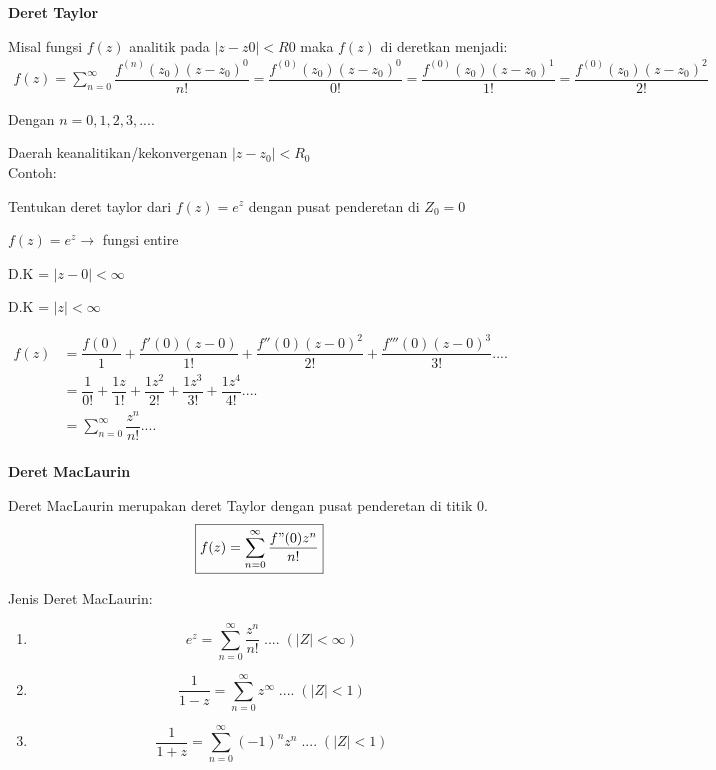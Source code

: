 \documentclass{article}
\begin{document}
\textbf{Deret Taylor}

Misal fungsi $f(z)$ analitik pada $|z-z0| < R0$ maka $f(z)$ di deretkan menjadi:
\begin{align}
    \boxed{f(z) = \sum_{n=0}^{\infty}\dfrac{f^{(n)}{(z_0)(z-z_0)^0}}{n!}=\dfrac{f^{(0)}{(z_0)(z-z_0)^0}}{0!}=\dfrac{f^{(0)}{(z_0)(z-z_0)^1}}{1!}=\dfrac{f^{(0)}{(z_0)(z-z_0)^2}}{2!}}
    \nonumber
\end{align}

Dengan $n = 0, 1, 2, 3, ....$

Daerah keanalitikan/kekonvergenan $|z-z_0| < R_0$
\leavevmode\\

Contoh:

Tentukan deret taylor dari $f(z) = e^z$ dengan pusat penderetan di $Z_0 = 0$

$f(z) = e^z \rightarrow$  fungsi entire

D.K = $|z-0|<\infty$

D.K = $|z|<\infty$

\begin{align}
    f(z) & = \dfrac{f(0)}{1} + \dfrac{f'{(0)(z-0)}}{1!} + \dfrac{f''{(0)(z-0)^2}}{2!} + \dfrac{f'''{(0)(z-0)^3}}{3!}....
    \nonumber                                                                                                            \\
         & = \dfrac{1}{0!} + \dfrac{1z}{1!} + \dfrac{1z^2}{2!} + \dfrac{1z^3}{3!} + \dfrac{1z^4}{4!}....
    \nonumber                                                                                                            \\
         & = \sum_{n=0}^{\infty} \dfrac{z^n}{n!}....
    \nonumber
\end{align}
\leavevmode\\

\textbf{Deret MacLaurin}

Deret MacLaurin merupakan deret Taylor dengan pusat penderetan di titik 0.
\begin{align}
    \boxed{f(z) = \sum_{n=0}^{\infty} \dfrac{f"(0)z^n}{n!}}
    \nonumber
\end{align}

Jenis Deret MacLaurin:
\begin{enumerate}
    \item   \begin{equation}
              \boxed{e^z = \sum_{n=0}^{\infty} \dfrac{z^n}{n!}\;....\;(|Z|<\infty)}
              \nonumber
          \end{equation}
    \item   \begin{equation}
              \boxed{\dfrac{1}{1-z} = \sum_{n=0}^{\infty} z^{\infty}\;....\;(|Z|<1)}
              \nonumber
          \end{equation}
    \item   \begin{equation}
              \boxed{\dfrac{1}{1+z} = \sum_{n=0}^{\infty} (-1)^n z^n\;....\;(|Z|<1)}
              \nonumber
          \end{equation}
\end{enumerate}
\leavevmode\\
\end{document}
